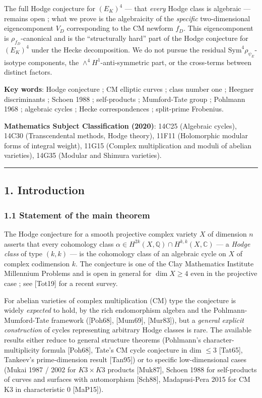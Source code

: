 \documentclass[
  11pt,
  a4paper,
]{amsart}
\begin{document}
The full Hodge conjecture for \((E_K)^4\) --- that \emph{every} Hodge class is algebraic --- remains open ; what we prove is the algebraicity of the \emph{specific} two-dimensional eigencomponent \(V_D\) corresponding to the CM newform \(f_D\). This eigencomponent is \(\rho_{f_D}\)-canonical and is the ``structurally hard'' part of the Hodge conjecture for \((E_K)^4\) under the Hecke decomposition. We do not pursue the residual \(\mathrm{Sym}^4 \rho_{\psi_E}\)-isotype components, the \(\wedge^4 H^1\)-anti-symmetric part, or the cross-terms between distinct factors.

\textbf{Key words}: Hodge conjecture ; CM elliptic curves ; class number one ; Heegner discriminants ; Schoen 1988 ; self-products ; Mumford-Tate group ; Pohlmann 1968 ; algebraic cycles ; Hecke correspondences ; split-prime Frobenius.

\textbf{Mathematics Subject Classification (2020)}: 14C25 (Algebraic cycles), 14C30 (Transcendental methods, Hodge theory), 11F11 (Holomorphic modular forms of integral weight), 11G15 (Complex multiplication and moduli of abelian varieties), 14G35 (Modular and Shimura varieties).

\begin{center}\rule{0.5\linewidth}{0.5pt}\end{center}

\hypertarget{introduction}{%
\subsection{1. Introduction}\label{introduction}}

\hypertarget{statement-of-the-main-theorem}{%
\subsubsection{1.1 Statement of the main theorem}\label{statement-of-the-main-theorem}}

The Hodge conjecture for a smooth projective complex variety \(X\) of dimension \(n\) asserts that every cohomology class \(\alpha \in H^{2k}(X, \mathbb{Q}) \cap H^{k,k}(X, \mathbb{C})\) --- a \emph{Hodge class} of type \((k,k)\) --- is the cohomology class of an algebraic cycle on \(X\) of complex codimension \(k\). The conjecture is one of the Clay Mathematics Institute Millennium Problems and is open in general for \(\dim X \geq 4\) even in the projective case ; see {[}Tot19{]} for a recent survey.

For abelian varieties of complex multiplication (CM) type the conjecture is widely \emph{expected} to hold, by the rich endomorphism algebra and the Pohlmann-Mumford-Tate framework ({[}Poh68{]}, {[}Mum69{]}, {[}Mur83{]}), but a \emph{general explicit construction} of cycles representing arbitrary Hodge classes is rare. The available results either reduce to general structure theorems (Pohlmann's character-multiplicity formula {[}Poh68{]}, Tate's CM cycle conjecture in dim \(\leq 3\) {[}Tat65{]}, Tankeev's prime-dimension result {[}Tan95{]}) or to specific low-dimensional cases (Mukai 1987 / 2002 for \(K3 \times K3\) products {[}Muk87{]}, Schoen 1988 for self-products of curves and surfaces with automorphism {[}Sch88{]}, Madapusi-Pera 2015 for CM K3 in characteristic \(0\) {[}MaP15{]}).
\end{document}
